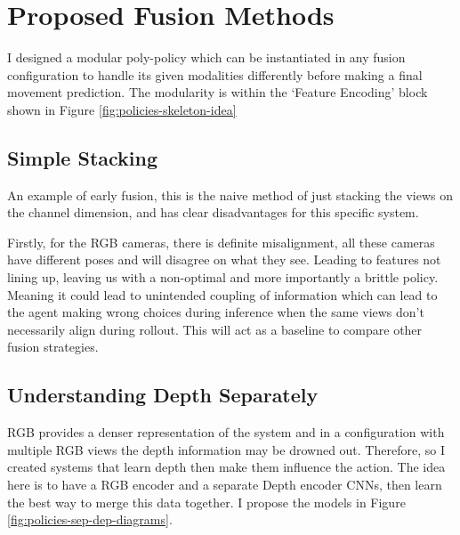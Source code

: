 \section{Proposed Fusion Methods}\label{sec:proposed-fusion}
I designed a modular poly-policy which can be instantiated in any fusion configuration to handle its given modalities differently before making a final movement prediction. The modularity is within the `Feature Encoding' block shown in Figure \ref{fig:policies-skeleton-idea}

\subsection{Simple Stacking}
An example of early fusion, this is the naive method of just stacking the views on the channel dimension, and has clear disadvantages for this specific system.

Firstly, for the RGB cameras, there is definite misalignment, all these cameras have different poses and will disagree on what they see. Leading to features not lining up, leaving us with a non-optimal and more importantly a brittle policy. Meaning it could lead to unintended coupling of information which can lead to the agent making wrong choices during inference when the same views don't necessarily align during rollout. This will act as a baseline to compare other fusion strategies.

\subsection{Understanding Depth Separately}\label{subsec:policies-understand-depth-sep}
RGB provides a denser representation of the system and in a configuration with multiple RGB views the depth information may be drowned out. Therefore, so I created systems that learn depth then make them influence the action. The idea here is to have a RGB encoder and a separate Depth encoder CNNs, then learn the best way to merge this data together. I propose the models in Figure \ref{fig:policies-sep-dep-diagrams}.

